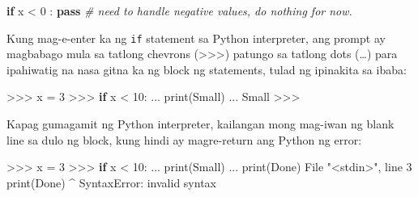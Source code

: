 \documentclass[10pt,]{book}
\newenvironment{Shaded}{}{}
\newcommand{\BuiltInTok}[1]{\textcolor[rgb]{0.00,0.50,0.00}{#1}}
\newcommand{\CommentTok}[1]{\textcolor[rgb]{0.38,0.63,0.69}{\textit{#1}}}
\newcommand{\ControlFlowTok}[1]{\textcolor[rgb]{0.00,0.44,0.13}{\textbf{#1}}}
\newcommand{\DecValTok}[1]{\textcolor[rgb]{0.25,0.63,0.44}{#1}}
\newcommand{\NormalTok}[1]{#1}
\newcommand{\OperatorTok}[1]{\textcolor[rgb]{0.40,0.40,0.40}{#1}}
\newcommand{\PreprocessorTok}[1]{\textcolor[rgb]{0.74,0.48,0.00}{#1}}
\newcommand{\StringTok}[1]{\textcolor[rgb]{0.25,0.44,0.63}{#1}}
\begin{document}
 

\begin{Shaded}
\begin{Highlighting}[]
\ControlFlowTok{if}\NormalTok{ x }\OperatorTok{\textless{}} \DecValTok{0}\NormalTok{ :}
    \ControlFlowTok{pass}   \CommentTok{\# need to handle negative values, do nothing for now.}
\end{Highlighting}
\end{Shaded}

Kung mag-e-enter ka ng \texttt{if} statement sa Python interpreter, ang
prompt ay magbabago mula sa tatlong chevrons
(\textgreater\textgreater\textgreater) patungo sa tatlong dots (\ldots)
para ipahiwatig na nasa gitna ka ng block ng statements, tulad ng
ipinakita sa ibaba:

\begin{Shaded}
\begin{Highlighting}[]
\OperatorTok{\textgreater{}\textgreater{}\textgreater{}}\NormalTok{ x }\OperatorTok{=} \DecValTok{3}
\OperatorTok{\textgreater{}\textgreater{}\textgreater{}} \ControlFlowTok{if}\NormalTok{ x }\OperatorTok{\textless{}} \DecValTok{10}\NormalTok{:}
\NormalTok{...    }\BuiltInTok{print}\NormalTok{(}\StringTok{\textquotesingle{}Small\textquotesingle{}}\NormalTok{)}
\NormalTok{...}
\NormalTok{Small}
\OperatorTok{\textgreater{}\textgreater{}\textgreater{}}
\end{Highlighting}
\end{Shaded}

Kapag gumagamit ng Python interpreter, kailangan mong mag-iwan ng blank
line sa dulo ng block, kung hindi ay magre-return ang Python ng error:

\begin{Shaded}
\begin{Highlighting}[]
\OperatorTok{\textgreater{}\textgreater{}\textgreater{}}\NormalTok{ x }\OperatorTok{=} \DecValTok{3}
\OperatorTok{\textgreater{}\textgreater{}\textgreater{}} \ControlFlowTok{if}\NormalTok{ x }\OperatorTok{\textless{}} \DecValTok{10}\NormalTok{:}
\NormalTok{...    }\BuiltInTok{print}\NormalTok{(}\StringTok{\textquotesingle{}Small\textquotesingle{}}\NormalTok{)}
\NormalTok{... }\BuiltInTok{print}\NormalTok{(}\StringTok{\textquotesingle{}Done\textquotesingle{}}\NormalTok{)}
\NormalTok{  File }\StringTok{"\textless{}stdin\textgreater{}"}\NormalTok{, line }\DecValTok{3}
    \BuiltInTok{print}\NormalTok{(}\StringTok{\textquotesingle{}Done\textquotesingle{}}\NormalTok{)}
        \OperatorTok{\^{}}
\PreprocessorTok{SyntaxError}\NormalTok{: invalid syntax}
\end{Highlighting}
\end{Shaded}
\end{document}

